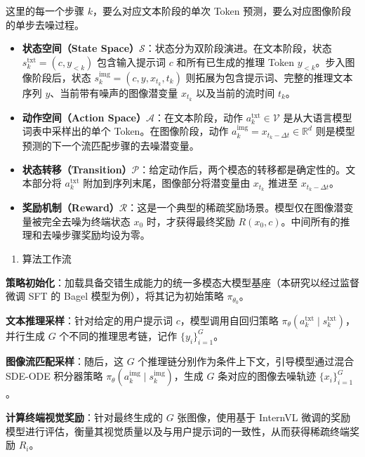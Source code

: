 这里的每一个步骤 \(k\)，要么对应文本阶段的单次 Token 预测，要么对应图像阶段的单步去噪过程。

\begin{itemize}
\tightlist
\item
  \textbf{状态空间（State Space）\(\mathcal{S}\)}：状态分为双阶段演进。在文本阶段，状态 \(s_k^{\mathrm{txt}}=(c,y_{\lt k})\) 包含输入提示词 \(c\) 和所有已生成的推理 Token \(y_{\lt k}\)。步入图像阶段后，状态 \(s_k^{\mathrm{img}}=(c,y,x_{t_k},t_k)\) 则拓展为包含提示词、完整的推理文本序列 \(y\)、当前带有噪声的图像潜变量 \(x_{t_k}\) 以及当前的流时间 \(t_k\)。
\item
  \textbf{动作空间（Action Space）\(\mathcal{A}\)}：在文本阶段，动作 \(a_k^{\mathrm{txt}}\in\mathcal{V}\) 是从大语言模型词表中采样出的单个 Token。在图像阶段，动作 \(a_k^{\mathrm{img}}=x_{t_k-\Delta t}\in\mathbb{R}^d\) 则是模型预测的下一个流匹配步骤的去噪潜变量。
\item
  \textbf{状态转移（Transition）\(\mathcal{P}\)}：给定动作后，两个模态的转移都是确定性的。文本部分将 \(a_k^{\mathrm{txt}}\) 附加到序列末尾，图像部分将潜变量由 \(x_{t_k}\) 推进至 \(x_{t_k-\Delta t}\)。
\item
  \textbf{奖励机制（Reward）\(\mathcal{R}\)}：这是一个典型的稀疏奖励场景。模型仅在图像潜变量被完全去噪为终端状态 \(x_0\) 时，才获得最终奖励 \(R(x_0,c)\)。中间所有的推理和去噪步骤奖励均设为零。
\end{itemize}

\begin{enumerate}
\def\labelenumi{\arabic{enumi}.}
\setcounter{enumi}{1}
\tightlist
\item
  算法工作流
\end{enumerate}

\textbf{策略初始化}：加载具备交错生成能力的统一多模态大模型基座（本研究以经过监督微调 SFT 的 Bagel 模型为例），将其记为初始策略 \(\pi_{\theta_0}\)。

\textbf{文本推理采样}：针对给定的用户提示词 \(c\)，模型调用自回归策略 \(\pi_{\theta}(a_k^{\mathrm{txt}}\mid s_k^{\mathrm{txt}})\)，并行生成 \(G\) 个不同的推理思考链，记作 \(\{y_i\}_{i=1}^{G}\)。

\textbf{图像流匹配采样}：随后，这 \(G\) 个推理链分别作为条件上下文，引导模型通过混合 SDE-ODE 积分器策略 \(\pi_{\theta}(a_k^{\mathrm{img}}\mid s_k^{\mathrm{img}})\)，生成 \(G\) 条对应的图像去噪轨迹 \(\{x_i\}_{i=1}^{G}\)。

\textbf{计算终端视觉奖励}：针对最终生成的 \(G\) 张图像，使用基于 InternVL 微调的奖励模型进行评估，衡量其视觉质量以及与用户提示词的一致性，从而获得稀疏终端奖励 \(R_i\)。

